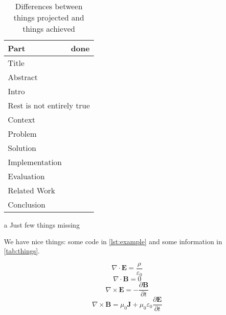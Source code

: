 \documentclass[draft,master]{swathesis}
\begin{document}
\begin{table}
  \centering
  \tableinsidecommand
  \begin{threeparttable}
    \caption{Differences between things projected and things achieved}
    \label{tab:things}
    \begin{tabular}{>{}p{.4\linewidth}@{}c} \toprule
      Part           & done        \\ \midrule
      Title          & \y          \\
      Abstract       & \n          \\
      Intro          & \y          \\
      \multicolumn{2}{c}{Rest is not entirely true} \\ \midrule
      Context        & \y          \\
      Problem        & \n\tnote{a} \\
      Solution       & \y          \\
      Implementation & \y          \\
      Evaluation     & \n          \\
      Related Work   & \n          \\
      Conclusion     & \y          \\ \bottomrule
    \end{tabular}
    \begin{tablenotes}
      \item [a] Just few things missing
    \end{tablenotes}
  \end{threeparttable}
\end{table}

We have nice things: some code in \autoref{lst:example} and some information
in \autoref{tab:things}.



\[\nabla \cdot \mathbf{E} = \frac{\rho}{\varepsilon_0}\]
\[\nabla \cdot \mathbf{B} = 0\]
\[\nabla \times \mathbf{E} = -\frac {\partial \mathbf{B}}{\partial t}\]
\[\nabla \times \mathbf{B} = \mu_0 \mathbf{J} + \mu_0\varepsilon_0  \frac{\partial \mathbf{E}}{\partial t}\]




\blinddocument

\printbibliography
\clearpage
\appendix

\backmatter
\markboth{}\relax

\end{document}
